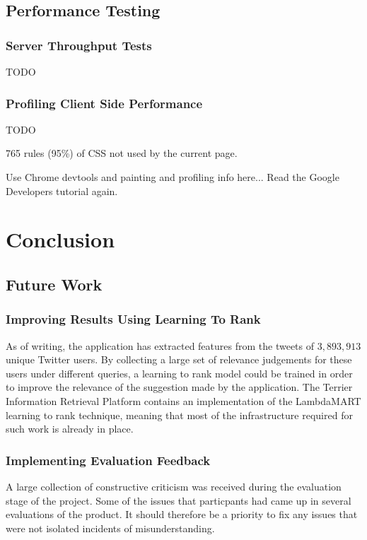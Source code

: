 \documentclass{l4proj}
\begin{document}
\section{Performance Testing}

    \subsection{Server Throughput Tests}
    TODO
    \subsection{Profiling Client Side Performance}
    TODO
    
    765 rules (95\%) of CSS not used by the current page.
    
    Use Chrome devtools and painting and profiling info here... Read the Google Developers tutorial again.
        
    
    



\chapter{Conclusion}
    
    \section{Future Work}
    
        \subsection{Improving Results Using Learning To Rank}
        As of writing, the application has extracted features from the tweets of $3,893,913$ unique Twitter users. By collecting a large set of relevance judgements for these users under different queries, a learning to rank model could be trained in order to improve the relevance of the suggestion made by the application. The Terrier Information Retrieval Platform contains an implementation of the LambdaMART learning to rank technique, meaning that most of the infrastructure required for such work is already in place.
        
        \subsection{Implementing Evaluation Feedback}
        A large collection of constructive criticism was received during the evaluation stage of the project. Some of the issues that particpants had came up in several evaluations of the product. It should therefore be a priority to fix any issues that were not isolated incidents of misunderstanding.
        
\end{document}
